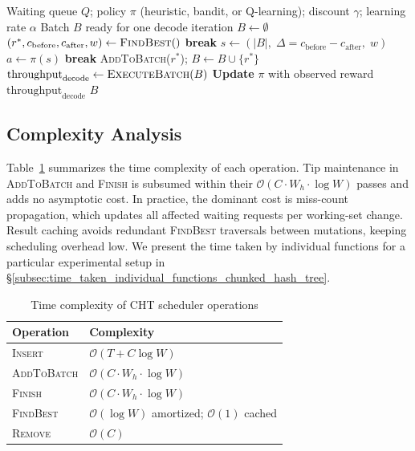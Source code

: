 \begin{algorithm}[t]
\caption{\textsc{BuildBatch}()}
\label{alg:rl_batch}
\begin{algorithmic}[1]
\Require Waiting queue $Q$; policy $\pi$ (heuristic, bandit, or Q-learning); discount $\gamma$; learning rate $\alpha$
\Ensure Batch $B$ ready for one decode iteration
\State $B \gets \emptyset$
    \State $(r^*, c_{\mathrm{before}}, c_{\mathrm{after}}, w) \gets \textsc{FindBest}()$
     \textbf{break} \EndIf
    \State $s \gets (|B|,\; \Delta = c_{\mathrm{before}} - c_{\mathrm{after}},\; w)$
    \State $a \gets \pi(s)$ 
     \textbf{break} \EndIf
    \State \textsc{AddToBatch}($r^*$); \quad $B \gets B \cup \{r^*\}$
\EndWhile
\State $\text{throughput}_{\mathrm{decode}} \gets \textsc{ExecuteBatch}(B)$
\State \textbf{Update} $\pi$ with observed reward $\text{throughput}_{\mathrm{decode}}$ 
\State \Return $B$
\end{algorithmic}
\end{algorithm}

\subsection{Complexity Analysis}
Table~\ref{tab:complexity} summarizes the time complexity of each operation. Tip maintenance in \textsc{AddToBatch} and \textsc{Finish} is subsumed within their $\mathcal{O}(C \cdot W_h \cdot \log W)$ passes and adds no asymptotic cost. In practice, the dominant cost is miss-count propagation, which updates all affected waiting requests per working-set change. Result caching avoids redundant \textsc{FindBest} traversals between mutations, keeping scheduling overhead low. We present the time taken by individual functions for a particular experimental setup in \S\ref{subsec:time_taken_individual_functions_chunked_hash_tree}. 

\begin{table}[t]
\centering
\begin{tabular}{ll}
\hline
\textbf{Operation} & \textbf{Complexity} \\
\hline
\textsc{Insert}     & $\mathcal{O}(T + C \log W)$ \\
\textsc{AddToBatch}  & $\mathcal{O}(C \cdot W_h \cdot \log W)$ \\
\textsc{Finish}      & $\mathcal{O}(C \cdot W_h \cdot \log W)$ \\
\textsc{FindBest}    & $\mathcal{O}(\log W)$ amortized; $\mathcal{O}(1)$ cached \\
\textsc{Remove}      & $\mathcal{O}(C)$ \\
\hline
\end{tabular}
\caption{Time complexity of CHT scheduler operations}
\label{tab:complexity}
\vspace{-10pt}
\end{table}

